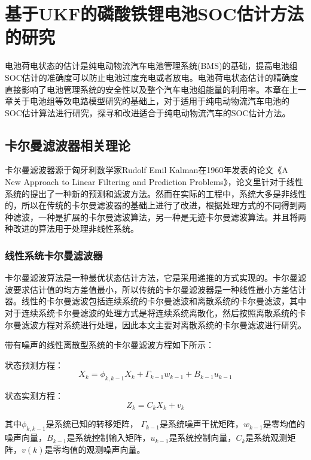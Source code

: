 
\chapter{基于UKF的磷酸铁锂电池SOC估计方法的研究}
电池荷电状态的估计是纯电动物流汽车电池管理系统(BMS)的基础，提高电池组SOC估计的准确度可以防止电池过度充电或者放电。电池荷电状态估计的精确度直接影响了电池管理系统的安全性以及整个汽车电池组能量的利用率。本章在上一章关于电池组等效电路模型研究的基础上，对于适用于纯电动物流汽车电池的SOC估计算法进行研究，探寻和改进适合于纯电动物流汽车的SOC估计方法。

\section{卡尔曼滤波器相关理论}
卡尔曼滤波器源于匈牙利数学家Rudolf Emil Kalman在1960年发表的论文《A New Approach to Linear Filtering and Prediction Problems》，论文里针对于线性系统的提出了一种新的预测和滤波方法。然而在实际的工程中，系统大多是非线性的，所以在传统的卡尔曼滤波器的基础上进行了改进，根据处理方式的不同得到两种滤波，一种是扩展的卡尔曼滤波算法，另一种是无迹卡尔曼滤波算法。并且将两种改进的算法用于处理非线性系统。
\subsection{线性系统卡尔曼滤波器}
卡尔曼滤波算法是一种最优状态估计方法，它是采用递推的方式实现的。卡尔曼滤波要求估计值的均方差值最小，所以传统的卡尔曼滤波器是一种线性最小方差估计器。线性的卡尔曼滤波包括连续系统的卡尔曼滤波和离散系统的卡尔曼滤波，其中对于连续系统卡尔曼滤波的处理方式是将连续系统离散化，然后按照离散系统的卡尔曼滤波方程对系统进行处理，因此本文主要对离散系统的卡尔曼滤波进行研究。

带有噪声的线性离散型系统的卡尔曼滤波方程如下所示：

状态预测方程：
\begin{equation}
{{X}_{k}}={{\phi }_{k,k-1}}{{X}_{k}}+{{\Gamma }_{k-1}}{{w}_{k-1}}+{{B}_{k-1}}{{u}_{k-1}}
\end{equation}

状态实测方程：
\begin{equation}
{{Z}_{k}}={{C}_{k}}{{X}_{k}}+{{v}_{k}}
\end{equation}

其中${{\phi }_{k,k-1}}$是系统已知的转移矩阵， ${{\Gamma }_{k-1}}$是系统噪声干扰矩阵，${{w}_{k-1}}$是零均值的噪声向量，${{B}_{k-1}}$是系统控制输入矩阵，${{u}_{k-1}}$是系统控制向量，${{C}_{k}}$是系统观测矩阵，$v(k)$是零均值的观测噪声向量。

